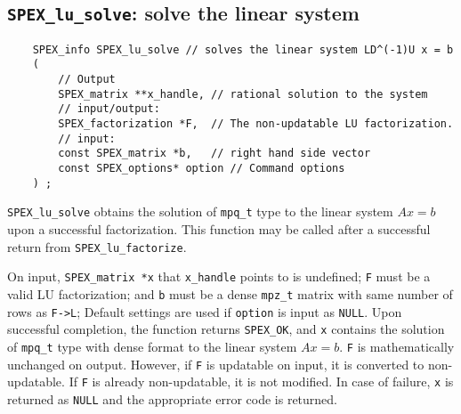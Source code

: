 \documentclass[12pt]{report}
\theoremstyle{definition}
\begin{document}
\subsection{\texttt{SPEX\_lu\_solve}: solve the linear system}
\label{ss:SPEX_Left_LU_solve}

\begin{mdframed}[userdefinedwidth=6in]
{\footnotesize
\begin{verbatim}
    SPEX_info SPEX_lu_solve // solves the linear system LD^(-1)U x = b
    (
        // Output
        SPEX_matrix **x_handle, // rational solution to the system
        // input/output:
        SPEX_factorization *F,  // The non-updatable LU factorization.
        // input:
        const SPEX_matrix *b,   // right hand side vector
        const SPEX_options* option // Command options
    ) ;
\end{verbatim}
} \end{mdframed}

\verb|SPEX_lu_solve| obtains the solution of \verb|mpq_t| type to the
linear system $Ax=b$ upon a successful factorization.  This function may be
called after a successful return from \verb|SPEX_lu_factorize|.

On input, \verb|SPEX_matrix *x| that \verb|x_handle| points to is undefined; \verb|F| must be a valid LU factorization; and \verb|b| must be a dense \verb|mpz_t| matrix with same number of rows as \verb|F->L|;  Default settings are used if
\verb|option| is input as \verb|NULL|. Upon successful completion, the function returns \verb|SPEX_OK|, and \verb|x| contains the solution of \verb|mpq_t| type with dense format to the linear system $Ax=b$. \verb|F| is mathematically unchanged on output. However, if \verb|F| is updatable on input, it is converted to non-updatable. If \verb|F| is already non-updatable, it is not modified.
In case of failure, \verb|x| is returned as \verb|NULL| and the appropriate error code is returned.

\end{document}
